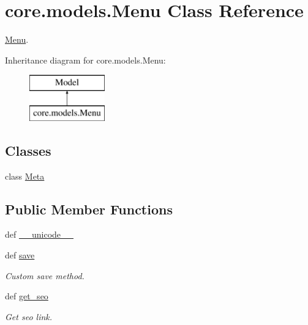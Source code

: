 \hypertarget{classcore_1_1models_1_1Menu}{\section{core.\-models.\-Menu Class Reference}
\label{classcore_1_1models_1_1Menu}
}


\hyperlink{classcore_1_1models_1_1Menu}{Menu}.  


Inheritance diagram for core.\-models.\-Menu\-:\begin{figure}[H]
\begin{center}
\leavevmode
\includegraphics[height=2.000000cm]{classcore_1_1models_1_1Menu}
\end{center}
\end{figure}
\subsection*{Classes}
\begin{DoxyCompactItemize}
\item 
class \hyperlink{classcore_1_1models_1_1Menu_1_1Meta}{Meta}
\end{DoxyCompactItemize}
\subsection*{Public Member Functions}
\begin{DoxyCompactItemize}
\item 
def \hyperlink{classcore_1_1models_1_1Menu_a2d312c756cc18acc82c71d7ca7e3a2c7}{\-\_\-\-\_\-unicode\-\_\-\-\_\-}
\item 
def \hyperlink{classcore_1_1models_1_1Menu_ad0df5ff467b92ce10a1fa4b1ed2a7095}{save}
\begin{DoxyCompactList}\small\item\em Custom save method. \end{DoxyCompactList}\item 
def \hyperlink{classcore_1_1models_1_1Menu_ad6879fe999e825fca1132410a54ecb76}{get\-\_\-seo}
\begin{DoxyCompactList}\small\item\em Get seo link. \end{DoxyCompactList}\end{DoxyCompactItemize}
